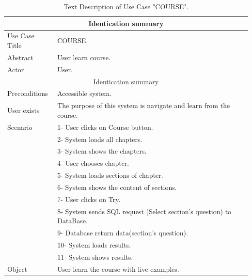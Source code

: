 \newpage

\begin{table}[h!]
	\begin{center}
		\begin{tabular}{ |p{3cm}|p{9cm}|  }
 		\hline
 		\multicolumn{2}{|c|}{Identication summary} \\
 		\hline
 		Use Case Title & COURSE. \\
 		\hline
 		Abstract   & User learn course. \\
		\hline
 		Actor&  User. \\
		\hline
		\multicolumn{2}{|c|}{Identication summary} \\
		\hline
		Preconditions & Accessible system.  \\
		\hline
		User exists    &  The purpose of this system is navigate and learn from the course. \\
		\hline
		Scenario &  1- User clicks on Course button. \\ & 2- System loads all chapters. \\ & 3- System shows the chapters. \\ & 4- User chooses chapter. \\ & 5- System loads sections of chapter. \\ & 6- System shows the content of sections. \\ & 7- User clicks on Try. \\ & 8- System sends SQL request (Select section's question) to DataBase.\\ & 9- Database return data(section's question).\\ & 10- System loads results.\\ & 11- System shows results.\\
		\hline
		Object& User learn the course with live examples.   \\
 		\hline
\end{tabular}
\end{center}
\caption{Text Description of Use Case "COURSE".}
\label{tab:DS COURSE}
\end{table}



